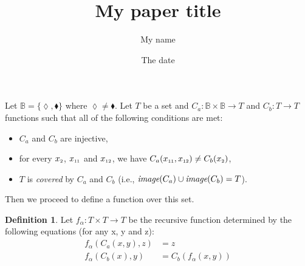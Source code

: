 \documentclass{article}
\title{My paper title}
\author{My name}
\date{The date}
\theoremstyle{definition}
\newtheorem{definition}{Definition}
\begin{document}
\maketitle

Let $\mathbb{B} = \{\lozenge, \blacklozenge \}$ where $\lozenge \neq \blacklozenge$. Let $T$ be a set and $C_{a} : \mathbb{B} \times 
                                                 \mathbb{B} \to T$ and $C_{b} : T \to T$ functions such that all of the following conditions are met: 
\begin{itemize}
\item $C_{a}$ and $C_{b}$ are injective, 
\item for every $x_{\mbox{\tiny 2}}$, $x_{\mbox{\tiny 11}}$ and $x_{\mbox{\tiny 12}}$, we have $C_{a}(x_{\mbox{\tiny 11}}, x_{\mbox{\tiny 12}}) \neq C_{b}(x_{\mbox{\tiny 2}})$,
\item $T$ is \textit{covered} by $C_{a}$ and $C_{b}$ (i.e., $\mbox{\it image}(C_{a})\cup\mbox{\it image}(C_{b}) =T$).
\end{itemize}

\noindent Then we proceed to define a function over this set.

\begin{definition}
Let $f_{\alpha} : T \times  T \to T$ be the recursive function determined by the following equations (for any x, y and z): 
\begin{align}
f_{\alpha}(C_{a}(x, y), z) &= z \label{f_1.simps_1}\\
f_{\alpha}(C_{b}(x), y) &= C_{b}(f_{\alpha}(x, y)) \label{f_1.simps_2}
\end{align}
\end{definition}
\end{document}
